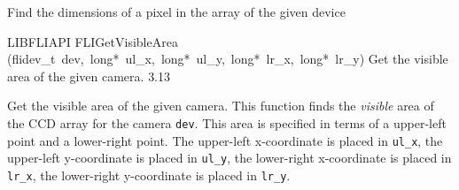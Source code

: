 \documentclass{article}
\begin{document}
\begin{cxxentry}
\begin{cxxfunction}
\begin{cxxdoc}
Find the dimensions of a pixel in the array of the given device


\end{cxxdoc}
\end{cxxfunction}
\begin{cxxfunction}
{LIBFLIAPI}
        {FLIGetVisibleArea}
        {(flidev\_t\ dev,\ long*\ ul\_x,\ long*\ ul\_y,\ long*\ lr\_x,\ long*\ lr\_y)}
        { Get the visible area of the given camera.}
        {3.13}
\begin{cxxdoc}

Get the visible area of the given camera.  This function finds the
\emph{visible} area of the CCD array for the camera \texttt{dev}.
This area is specified in terms of a upper-left point and a
lower-right point.  The upper-left x-coordinate is placed in
\texttt{ul\_x}, the upper-left y-coordinate is placed in
\texttt{ul\_y}, the lower-right x-coordinate is placed in
\texttt{lr\_x}, the lower-right y-coordinate is placed in
\texttt{lr\_y}.



\end{cxxdoc}
\end{cxxfunction}
\end{cxxentry}
\end{document}
